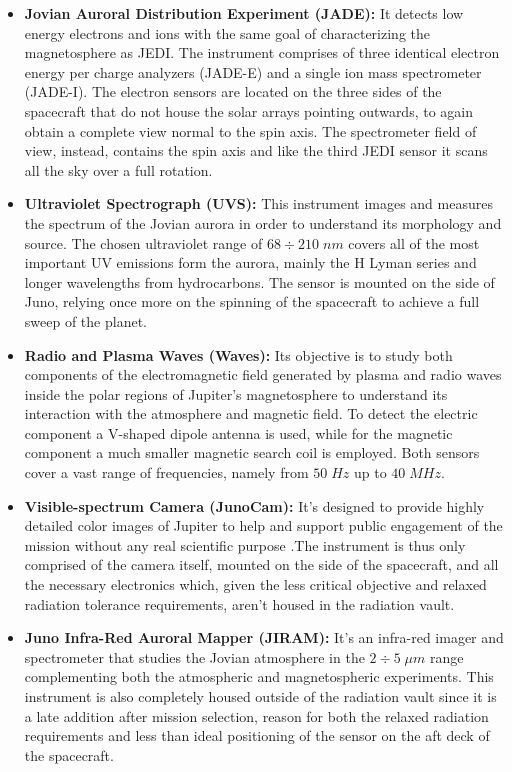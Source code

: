 \begin{itemize}
    \item \textbf{Jovian Auroral Distribution Experiment (JADE):} It detects low energy electrons and ions with the same goal of characterizing the magnetosphere as JEDI. The instrument comprises of three identical electron energy per charge analyzers (JADE-E) and a single ion mass spectrometer (JADE-I). The electron sensors are located on the three sides of the  spacecraft that do not house the solar arrays pointing outwards, to again obtain a complete view normal to the spin axis. The spectrometer field of view, instead, contains the spin axis and like the third JEDI sensor it scans all the sky over a full rotation.
    
    \item \textbf{Ultraviolet Spectrograph (UVS):} This instrument images and measures the spectrum of the Jovian aurora in order to understand its morphology and source. The chosen ultraviolet range of $68 \div 210 \;nm$ covers all of the most important UV emissions form the aurora, mainly the H Lyman series and longer wavelengths from hydrocarbons. The sensor is mounted on the side of Juno, relying once more on the spinning of the spacecraft to achieve a full sweep of the planet. 
    
    \item \textbf{Radio and Plasma Waves (Waves):} Its objective is to study both components of the electromagnetic field generated by plasma and radio waves inside the polar regions of Jupiter's magnetosphere to understand its interaction with the atmosphere and magnetic field. To detect the electric component a V-shaped dipole antenna is used, while for the magnetic component a much smaller magnetic search coil is employed. Both sensors cover a vast range of frequencies, namely from $50 \;Hz$ up to $40 \;MHz$.

    \item \textbf{Visible-spectrum Camera (JunoCam):} It's designed to provide highly detailed color images of Jupiter to help and support public engagement of the mission without any real scientific purpose .The instrument is thus only comprised of the camera itself, mounted on the side of the spacecraft, and all the necessary electronics which, given the less critical objective and relaxed radiation tolerance requirements, aren't housed in the radiation vault.

    \item \textbf{Juno Infra-Red Auroral Mapper (JIRAM):} It's an infra-red imager and spectrometer that studies the Jovian atmosphere in the \(2 \div 5 \;\mu m\) range complementing both the atmospheric and magnetospheric experiments. This instrument is also completely housed outside of the radiation vault since it is a late addition after mission selection, reason for both the relaxed radiation requirements and less than ideal positioning of the sensor on the aft deck of the spacecraft.
       
\end{itemize}

